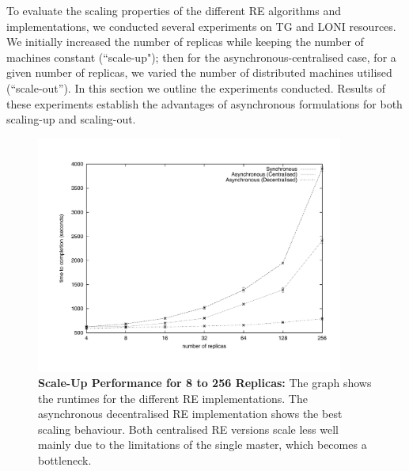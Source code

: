 \documentclass{rspublic}
\newcommand{\alnote}[1]{ {\textcolor{blue} { ***andre: #1 }}}
\newcommand{\alnote}[1]{}
\begin{document}
To evaluate the scaling properties of the different RE algorithms and
implementations, we conducted several experiments on TG and LONI
resources. We initially increased the number of replicas while keeping
the number of machines constant (``scale-up"); then for the
asynchronous-centralised case, for a given number of replicas, we
varied the number of distributed machines utilised (``scale-out''). In
this section we outline the experiments conducted. Results of these
experiments establish the advantages of asynchronous formulations for
both scaling-up and scaling-out.


%
\begin{figure}
\centering
\includegraphics[width=0.9\textwidth]{../data/scale_up.pdf}
\caption{\small \textbf{Scale-Up Performance for 8 to 256 Replicas:}
  The graph shows the runtimes for the different RE implementations.
  The asynchronous decentralised RE implementation shows the best
  scaling behaviour. Both centralised RE versions scale less well
  mainly due to the limitations of the single master, which becomes a
  bottleneck.}
\label{fig:scaleup}
\vspace{-1em}
\end{figure}

\end{document}
